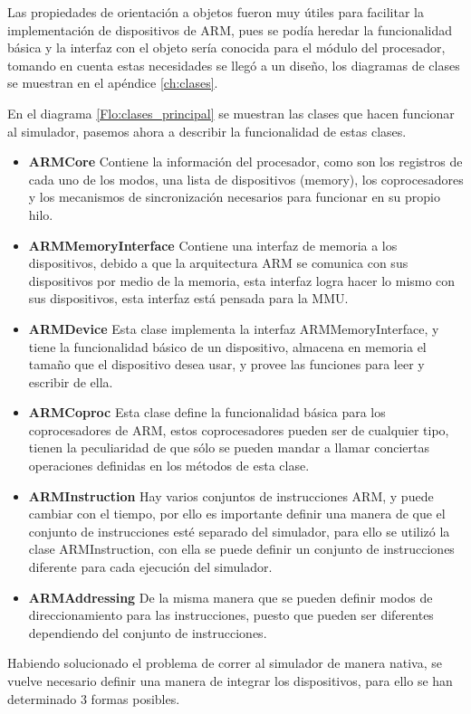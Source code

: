 Las propiedades de orientación a objetos fueron muy útiles para facilitar la implementación de dispositivos de ARM, pues se podía heredar la funcionalidad básica y la interfaz con el objeto sería conocida para el módulo del procesador, tomando en cuenta estas necesidades se llegó a un diseño, los diagramas de clases se muestran en el apéndice \ref{ch:clases}.

En el diagrama \ref{Flo:clases_principal} se muestran las clases que hacen funcionar al simulador, pasemos ahora a describir la funcionalidad de estas clases.

\begin{itemize}
\item \textbf{ARMCore} Contiene la información del procesador, como son los registros de cada uno de los modos, una lista de dispositivos (memory), los coprocesadores y los mecanismos de sincronización necesarios para funcionar en su propio hilo.
\item \textbf{ARMMemoryInterface} Contiene una interfaz de memoria a los dispositivos, debido a que la arquitectura ARM se comunica con sus dispositivos por medio de la memoria, esta interfaz logra hacer lo mismo con sus dispositivos, esta interfaz está pensada para la MMU.
\item \textbf{ARMDevice} Esta clase implementa la interfaz ARMMemoryInterface, y tiene la funcionalidad básico de un dispositivo, almacena en memoria el tamaño que el dispositivo desea usar, y provee las funciones para leer y escribir de ella.
\item \textbf{ARMCoproc} Esta clase define la funcionalidad básica para los coprocesadores de ARM, estos coprocesadores pueden ser de cualquier tipo, tienen la peculiaridad de que sólo se pueden mandar a llamar conciertas operaciones definidas en los métodos de esta clase.
\item \textbf{ARMInstruction} Hay varios conjuntos de instrucciones ARM, y puede cambiar con el tiempo, por ello es importante definir una manera de que el conjunto de instrucciones esté separado del simulador, para ello se utilizó la clase ARMInstruction, con ella se puede definir un conjunto de instrucciones diferente para cada ejecución del simulador.
\item \textbf{ARMAddressing} De la misma manera que se pueden definir modos de direccionamiento para las instrucciones, puesto que pueden ser diferentes dependiendo del conjunto de instrucciones.
\end{itemize}

Habiendo solucionado el problema de correr al simulador de manera nativa, se vuelve necesario definir una manera de integrar los dispositivos, para ello se han determinado 3 formas posibles.

